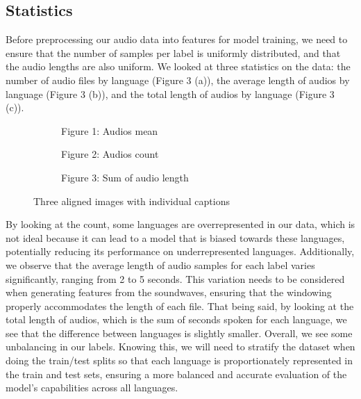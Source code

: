 \documentclass[twocolumn]{article}
\begin{document}
\subsection{Statistics}
\label{3.3}
Before preprocessing our audio data into features for model training, we need to ensure that the number of samples per label is uniformly distributed, and that the audio lengths are also uniform. We looked at three statistics on the data: the number of audio files by language (Figure 3 (a)), the average length of audios by language (Figure 3 (b)), and the total length of audios by language (Figure 3 (c)). 

\begin{figure}[!h]
    \centering
    \begin{subfigure}[b]{0.32\textwidth}
        \centering
        
        \caption{Figure 1: Audios mean}
        \label{fig:image1}
    \end{subfigure}
    \hfill
    \begin{subfigure}[b]{0.32\textwidth}
        \centering
        
        \caption{Figure 2: Audios count}
        \label{fig:image2}
    \end{subfigure}
    \hfill
    \begin{subfigure}[b]{0.32\textwidth}
        \centering
        
        \caption{Figure 3: Sum of audio length}
        \label{fig:image3}
    \end{subfigure}
    \caption{Three aligned images with individual captions}
    \label{fig:three_images}
\end{figure}

\newpage
By looking at the count, some languages are overrepresented in our data, which is not ideal because it can lead to a model that is biased towards these languages, potentially reducing its performance on underrepresented languages. Additionally, we observe that the average length of audio samples for each label varies significantly, ranging from 2 to 5 seconds. This variation needs to be considered when generating features from the soundwaves, ensuring that the windowing properly accommodates the length of each file. That being said, by looking at the total length of audios, which is the sum of seconds spoken for each language, we see that the difference between languages is slightly smaller. Overall, we see some unbalancing in our labels. Knowing this, we will need to stratify the dataset when doing the train/test splits so that each language is proportionately represented in the train and test sets, ensuring a more balanced and accurate evaluation of the model's capabilities across all languages.
\end{document}
